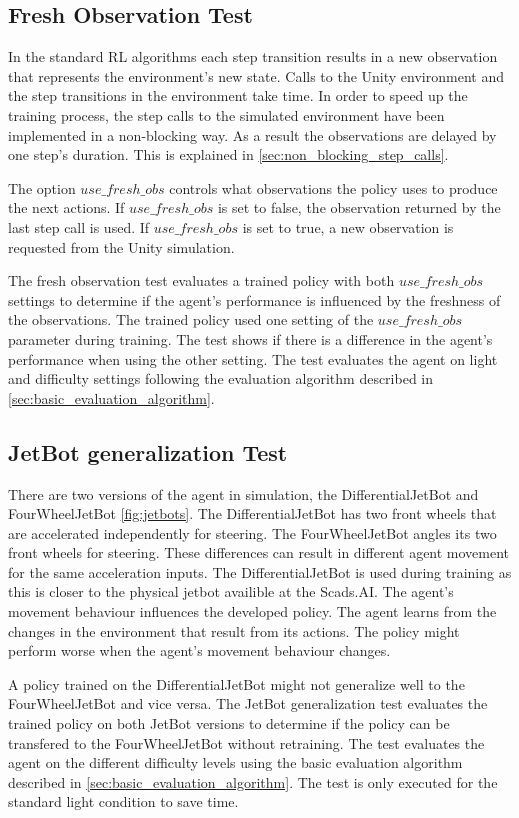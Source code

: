 \subsection{Fresh Observation Test}

In the standard \ac{RL} algorithms each step transition results in a new observation that represents the environment's new state. Calls to the Unity environment and the step transitions in the environment take time. In order to speed up the training process, the step calls to the simulated environment have been implemented in a non-blocking way. As a result the observations are delayed by one step's duration. This is explained in \ref{sec:non_blocking_step_calls}.

The option $use\_fresh\_obs$ controls what observations the policy uses to produce the next actions. If $use\_fresh\_obs$ is set to false, the observation returned by the last step call is used. If $use\_fresh\_obs$ is set to true, a new observation is requested from the Unity simulation.

The fresh observation test evaluates a trained policy with both $use\_fresh\_obs$ settings to determine if the agent's performance is influenced by the freshness of the observations. The trained policy used one setting of the $use\_fresh\_obs$ parameter during training. The test shows if there is a difference in the agent's performance when using the other setting. The test evaluates the agent on light and difficulty settings following the evaluation algorithm described in \ref{sec:basic_evaluation_algorithm}.


\subsection{JetBot generalization Test}

There are two versions of the agent in simulation, the DifferentialJetBot and FourWheelJetBot \ref{fig:jetbots}. The DifferentialJetBot has two front wheels that are accelerated independently for steering. The FourWheelJetBot angles its two front wheels for steering. These differences can result in different agent movement for the same acceleration inputs. The DifferentialJetBot is used during training as this is closer to the physical jetbot availible at the Scads.AI.
The agent's movement behaviour influences the developed policy. The agent learns from the changes in the environment that result from its actions. The policy might perform worse when the agent's movement behaviour changes.

A policy trained on the DifferentialJetBot might not generalize well to the FourWheelJetBot and vice versa. The JetBot generalization test evaluates the trained policy on both JetBot versions to determine if the policy can be transfered to the FourWheelJetBot without retraining. The test evaluates the agent on the different difficulty levels using the basic evaluation algorithm described in \ref{sec:basic_evaluation_algorithm}. The test is only executed for the standard light condition to save time.



